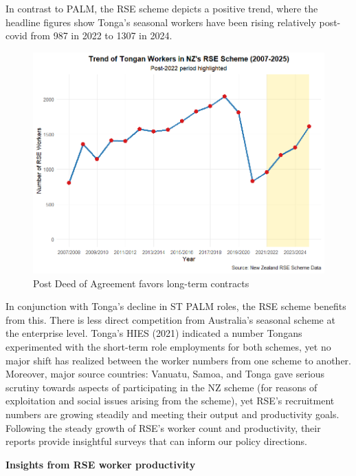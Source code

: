 \documentclass[9pt,a4paper,twocolumn,twoside]{tau-class/tau}
\begin{document}
        In contrast to PALM, the RSE scheme depicts a positive trend, where the headline figures show Tonga's seasonal workers have been rising relatively post-covid from 987 in 2022 to 1307 in 2024.
        


        	\begin{figure}[H]
    		\centering
    		\includegraphics[width=0.9\columnwidth]{figures/RSE_scheme.png}
    		\caption{Post Deed of Agreement favors long-term contracts}
    		\label{fig:RSE}
    	\end{figure}



        In conjunction with Tonga's decline in ST PALM roles, the RSE scheme benefits from this. There is less direct competition from Australia's seasonal scheme at the enterprise level. Tonga's HIES (2021) indicated a number Tongans experimented with the short-term role employments for both schemes, yet no major shift has realized between the worker numbers from one scheme to another. Moreover, major source countries: Vanuatu, Samoa, and Tonga gave serious scrutiny towards aspects of participating in the NZ scheme (for reasons of exploitation and social issues arising from the scheme), yet RSE's recruitment numbers are growing steadily and meeting their output and productivity goals. Following the steady growth of RSE's worker count and productivity, their reports provide insightful surveys that can inform our policy directions. 

\textbf{Insights from RSE worker productivity}
\end{document}
